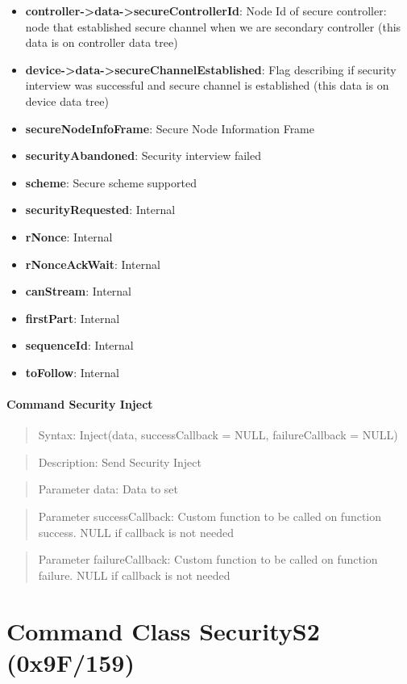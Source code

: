 \begin{itemize}
\item \textbf{controller->data->secureControllerId}: Node Id of secure controller: node that established secure channel when we are secondary controller (this data is on controller data tree)
\item \textbf{device->data->secureChannelEstablished}: Flag describing if security interview was successful and secure channel is established (this data is on device data tree)
\item \textbf{secureNodeInfoFrame}: Secure Node Information Frame
\item \textbf{securityAbandoned}: Security interview failed
\item \textbf{scheme}: Secure scheme supported
\item \textbf{securityRequested}: Internal
\item \textbf{rNonce}: Internal
\item \textbf{rNonceAckWait}: Internal
\item \textbf{canStream}: Internal
\item \textbf{firstPart}: Internal
\item \textbf{sequenceId}: Internal
\item \textbf{toFollow}: Internal
\end{itemize}

\paragraph{Command Security Inject}
\begin{quote}Syntax: Inject(data, successCallback = NULL, failureCallback = NULL)\end{quote}
\begin{quote}Description: Send Security Inject\end{quote}
\begin{quote}Parameter data: Data to set\end{quote}
\begin{quote}Parameter successCallback: Custom function to be called on function success. NULL if callback is not needed\end{quote}
\begin{quote}Parameter failureCallback: Custom function to be called on function failure. NULL if callback is not needed\end{quote}



\section{Command Class SecurityS2 (0x9F/159)}

